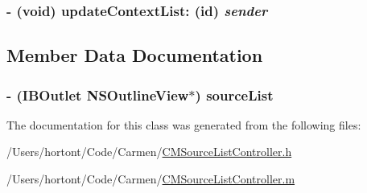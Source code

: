 \hypertarget{interface_c_m_source_list_controller_d0a020d93ede188cbd34188e562497c4}{
\subsubsection[updateContextList:]{\setlength{\rightskip}{0pt plus 5cm}- (void) updateContextList: (id) {\em sender}}}
\label{interface_c_m_source_list_controller_d0a020d93ede188cbd34188e562497c4}




\subsection{Member Data Documentation}
\hypertarget{interface_c_m_source_list_controller_3ecaeac5cbd5f29ff48aeb1d7a2ef494}{
\subsubsection[sourceList]{\setlength{\rightskip}{0pt plus 5cm}- (IBOutlet NSOutlineView$\ast$) {\bf sourceList}}}
\label{interface_c_m_source_list_controller_3ecaeac5cbd5f29ff48aeb1d7a2ef494}




The documentation for this class was generated from the following files:\begin{CompactItemize}
\item 
/Users/hortont/Code/Carmen/\hyperlink{_c_m_source_list_controller_8h}{CMSourceListController.h}\item 
/Users/hortont/Code/Carmen/\hyperlink{_c_m_source_list_controller_8m}{CMSourceListController.m}\end{CompactItemize}
